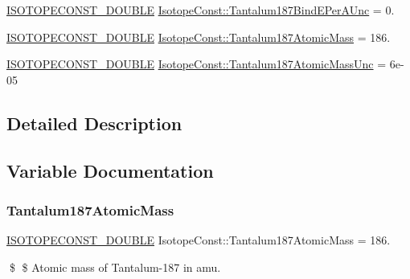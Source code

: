 \begin{DoxyCompactItemize}
\mbox{\hyperlink{group___isotope_const-_macros_ga8f45a7272ce02c0b4c65c44636ed719a}{I\+S\+O\+T\+O\+P\+E\+C\+O\+N\+S\+T\+\_\+\+D\+O\+U\+B\+LE}} \mbox{\hyperlink{group___isotope_const-_tantalum-_ta187_ga902596f2bafa43047ef56a99669994be}{Isotope\+Const\+::\+Tantalum187\+Bind\+E\+Per\+A\+Unc}} = 0.
\item 
\mbox{\hyperlink{group___isotope_const-_macros_ga8f45a7272ce02c0b4c65c44636ed719a}{I\+S\+O\+T\+O\+P\+E\+C\+O\+N\+S\+T\+\_\+\+D\+O\+U\+B\+LE}} \mbox{\hyperlink{group___isotope_const-_tantalum-_ta187_gacf2b5bc73dd0467ca4b2c2f23b556050}{Isotope\+Const\+::\+Tantalum187\+Atomic\+Mass}} = 186.
\item 
\mbox{\hyperlink{group___isotope_const-_macros_ga8f45a7272ce02c0b4c65c44636ed719a}{I\+S\+O\+T\+O\+P\+E\+C\+O\+N\+S\+T\+\_\+\+D\+O\+U\+B\+LE}} \mbox{\hyperlink{group___isotope_const-_tantalum-_ta187_ga2815c189cbdee616b6c3fd54407018d1}{Isotope\+Const\+::\+Tantalum187\+Atomic\+Mass\+Unc}} = 6e-\/05
\end{DoxyCompactItemize}


\subsection{Detailed Description}


\subsection{Variable Documentation}
\mbox{\label{group___isotope_const-_tantalum-_ta187_gacf2b5bc73dd0467ca4b2c2f23b556050}} 
\subsubsection{\texorpdfstring{Tantalum187\+Atomic\+Mass}{Tantalum187AtomicMass}}
{\footnotesize\ttfamily \mbox{\hyperlink{group___isotope_const-_macros_ga8f45a7272ce02c0b4c65c44636ed719a}{I\+S\+O\+T\+O\+P\+E\+C\+O\+N\+S\+T\+\_\+\+D\+O\+U\+B\+LE}} Isotope\+Const\+::\+Tantalum187\+Atomic\+Mass = 186.}

\$ \$ Atomic mass of Tantalum-\/187 in amu. \mbox{\label{group___isotope_const-_tantalum-_ta187_ga2815c189cbdee616b6c3fd54407018d1}} 

